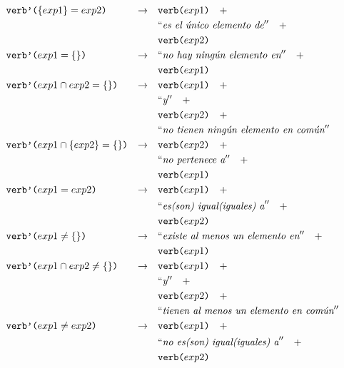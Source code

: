 \begin{align*} 
&\nlgfun{verb'($\{exp1\} = exp2$)} & \rightarrow \quad & \nlgfun{verb($exp1$)} \quad +  \\
& &											 		& \nlgtext{es el único elemento de} \quad +  \\
& &											 		& \nlgfun{verb($exp2$)} \\
&\nlgfun{verb'($exp1 = \{\}$)} & \rightarrow \quad & \nlgtext{no hay ningún elemento en}  \quad +  \\
& &											 		& \nlgfun{verb($exp1$)} \\
&\nlgfun{verb'($exp1 \cap exp2 = \{\}$)} & \rightarrow \quad & \nlgfun{verb($exp1$)} \quad +  \\
& &											 		& \nlgtext{y} \quad +  \\
& &											 		& \nlgfun{verb($exp2$)} \quad +  \\
& &											 		& \nlgtext{no tienen ningún elemento en común} \\
&\nlgfun{verb'($exp1 \cap \{exp2\} = \{\}$)} & \rightarrow \quad & \nlgfun{verb($exp2$)} \quad +  \\
& &											 		& \nlgtext{no pertenece a} \quad +  \\
& &											 		& \nlgfun{verb($exp1$)} \\
&\nlgfun{verb'($exp1 = exp2$)} & \rightarrow \quad & \nlgfun{verb($exp1$)} \quad +  \\
& &											 		& \nlgtext{es(son) igual(iguales) a} \quad +  \\
& &											 		& \nlgfun{verb($exp2$)} \\
&\nlgfun{verb'($exp1 \neq \{\}$)} & \rightarrow \quad & \nlgtext{existe al menos un elemento en} \quad +  \\
& &											 		& \nlgfun{verb($exp1$)} \\
&\nlgfun{verb'($exp1 \cap exp2 \neq \{\}$)} & \rightarrow \quad & \nlgfun{verb($exp1$)} \quad +  \\
& &											 		& \nlgtext{y} \quad +  \\
& &											 		& \nlgfun{verb($exp2$)} \quad +  \\
& &											 		& \nlgtext{tienen al menos un elemento en común} \\
&\nlgfun{verb'($exp1 \neq exp2$)} & \rightarrow \quad & \nlgfun{verb($exp1$)} \quad +  \\
& &											 		& \nlgtext{no es(son) igual(iguales) a} \quad +  \\
& &											 		& \nlgfun{verb($exp2$)} \\

\end{align*}
